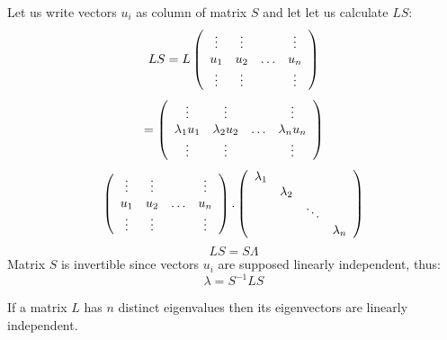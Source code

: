 \documentclass[12pt]{book}
\begin{document}
\begin{pf}
Let us write vectors $u_i$ as column of matrix $S$ and let let us calculate
$LS$: 
\begin{equation}
LS=L \left( \begin{array}{cccc}
              \vdots&\vdots& &\vdots\cr
               u_1&u_2&\ldots&u_n\cr 
              \vdots&\vdots& &\vdots\cr
\end{array} \right)
\end{equation}
\begin{equation}
=
\left( \begin{array}{cccc}
              \vdots&\vdots& &\vdots\cr
              \lambda_1 u_1&\lambda_2 u_2&\ldots&\lambda_n u_n\cr
              \vdots&\vdots& &\vdots\cr
\end{array} \right)
\end{equation}
\begin{equation}
\left( \begin{array}{cccc}
\vdots&\vdots& &\vdots\cr
              u_1&u_2&\ldots&u_n\cr
              \vdots&\vdots&
&\vdots\cr
\end{array} \right)
.
\left( \begin{array}{cccc}
\lambda_1& & &\cr
&\lambda_2&&\cr
&&\ddots&\cr
&&&\lambda_n
\end{array} \right)
\end{equation}
\begin{equation}
LS=S\Lambda
\end{equation}
Matrix $S$ is invertible since vectors $u_i$ are supposed linearly
independent, thus:
\begin{equation}
\lambda=S^{-1}LS
\end{equation}
\end{pf}
\begin{rem}\label{remmatrindep}
If a matrix $L$ has $n$ distinct eigenvalues then its eigenvectors are
linearly independent.
\end{rem}
\end{document}
